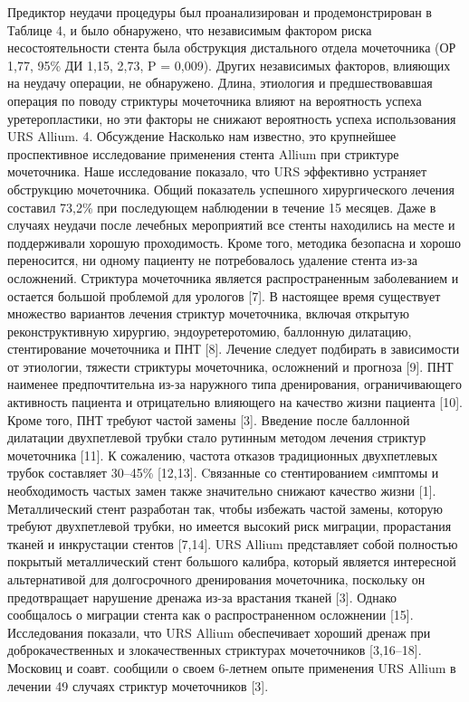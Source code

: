 Предиктор неудачи процедуры был проанализирован и продемонстрирован в Таблице 4, и было обнаружено, что независимым фактором риска несостоятельности стента была обструкция дистального отдела мочеточника (ОР 1,77, 95\% ДИ 1,15, 2,73, P = 0,009). Других независимых факторов, влияющих на неудачу операции, не обнаружено. Длина, этиология и предшествовавшая операция по поводу стриктуры мочеточника влияют на вероятность успеха уретеропластики, но эти факторы не снижают вероятность успеха использования URS Allium.
4. Обсуждение
Насколько нам известно, это крупнейшее проспективное исследование применения стента Allium при стриктуре мочеточника. Наше исследование показало, что URS эффективно устраняет обструкцию мочеточника. Общий показатель успешного хирургического лечения составил 73,2\% при последующем наблюдении в течение 15 месяцев. Даже в случаях неудачи после лечебных мероприятий все стенты находились на месте и поддерживали хорошую проходимость. Кроме того, методика безопасна и хорошо переносится, ни одному пациенту не потребовалось удаление стента из-за осложнений.
Стриктура мочеточника является распространенным заболеванием и остается большой проблемой для урологов [7]. В настоящее время существует множество вариантов лечения стриктур мочеточника, включая открытую реконструктивную хирургию, эндоуретеротомию, баллонную дилатацию, стентирование мочеточника и ПНТ [8]. Лечение следует подбирать в зависимости от этиологии, тяжести стриктуры мочеточника, осложнений и прогноза [9]. ПНТ наименее предпочтительна из-за наружного типа дренирования, ограничивающего активность пациента и отрицательно влияющего на качество жизни пациента [10]. Кроме того, ПНТ требуют частой замены [3]. Введение после баллонной дилатации двухпетлевой трубки стало рутинным методом лечения стриктур мочеточника [11]. К сожалению, частота отказов традиционных двухпетлевых трубок составляет 30–45\% [12,13]. Cвязанные со стентированием cимптомы и необходимость частых замен также значительно снижают качество жизни [1]. Металлический стент разработан так, чтобы избежать частой замены, которую требуют  двухпетлевой трубки, но имеется высокий риск миграции, прорастания тканей и инкрустации стентов [7,14].
URS Allium представляет собой полностью покрытый металлический стент большого калибра, который является интересной альтернативой для долгосрочного дренирования мочеточника, поскольку он предотвращает нарушение дренажа из-за врастания тканей [3]. Однако сообщалось о миграции стента как о распространенном осложнении [15]. Исследования показали, что URS Allium обеспечивает хороший дренаж при доброкачественных и злокачественных стриктурах мочеточников [3,16–18]. Московиц и соавт. сообщили о своем 6-летнем опыте применения URS Allium в лечении 49 случаях стриктур мочеточников [3].
